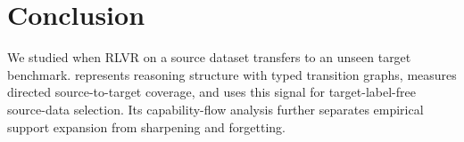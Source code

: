 \section{Conclusion}
\label{sec:conclusion}

We studied when RLVR on a source dataset transfers to an unseen target
benchmark.  \method represents reasoning structure with typed transition
graphs, measures directed source-to-target coverage, and uses this signal for
target-label-free source-data selection.  Its capability-flow analysis further
separates empirical support expansion from sharpening and forgetting.


